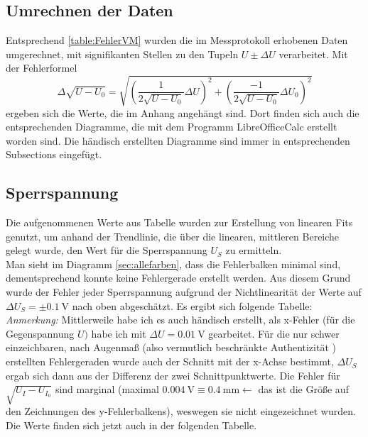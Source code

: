 \subsection{Umrechnen der Daten}
Entsprechend \cref{table:FehlerVM} wurden die im Messprotokoll erhobenen Daten umgerechnet, mit signifikanten Stellen zu den Tupeln \(U\pm\Delta U\) verarbeitet. 
Mit der Fehlerformel 
\begin{equation}
    \Delta \sqrt{U-U_0}=\sqrt{\left(\frac{1}{2\sqrt{U-U_0}} \Delta U\right)^2+\left(\frac{-1}{2\sqrt{U-U_0}} \Delta U_0\right)^2}
\end{equation}
ergeben sich die Werte, die im Anhang angehängt sind.
Dort finden sich auch die entsprechenden Diagramme, die mit dem Programm LibreOfficeCalc erstellt worden sind. Die händisch erstellten Diagramme sind immer in entsprechenden Subsections eingefügt.

\subsection{Sperrspannung}
Die aufgenommenen Werte aus Tabelle  wurden zur Erstellung von linearen Fits genutzt, um anhand der Trendlinie, die über die linearen, mittleren Bereiche gelegt wurde, den Wert für die Sperrspannung \(U_S\) zu ermitteln. \\Man sieht im Diagramm \cref{sec:allefarben}, dass die Fehlerbalken minimal sind, dementsprechend konnte keine Fehlergerade erstellt werden. Aus diesem Grund wurde der Fehler jeder Sperrspannung aufgrund der Nichtlinearität der Werte auf \(\Delta U_S=\pm \qty{0.1}{\volt}\) nach oben abgeschätzt. Es ergibt sich folgende Tabelle:
\emph{Anmerkung:} Mittlerweile habe ich es auch händisch erstellt, als x-Fehler (für die Gegenspannung \(U)\) habe ich mit \(\Delta U=\qty{0.01}{\volt}\) gearbeitet. Für die nur schwer einzeichbaren, nach Augenmaß (also vermutlich beschränkte  Authentizität ) erstellten Fehlergeraden wurde auch der Schnitt mit der x-Achse bestimmt, \(\Delta U_S\) ergab sich dann aus der Differenz der zwei Schnittpunktwerte. Die Fehler für \(\sqrt{U_I-U_{I_0}}\) sind marginal (maximal \(\qty{0.004}{\volt}\equiv \qty{0.4}{\milli\meter}\leftarrow\) das ist die Größe auf den Zeichnungen des y-Fehlerbalkens), weswegen sie nicht eingezeichnet wurden. Die Werte finden sich jetzt auch in der folgenden Tabelle.

